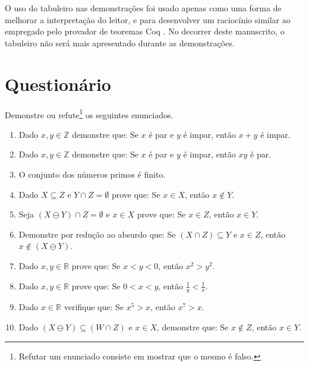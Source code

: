 \begin{rema}
	O uso do tabuleiro nas demonstrações foi usado apenas como uma forma de melhorar a interpretação do leitor, e para desenvolver um raciocínio similar ao empregado pelo provador de teoremas Coq \cite{coq2013}. No decorrer deste manuscrito, o tabuleiro não será mais apresentado durante as demonstrações.
\end{rema}



\section{Questionário}

\begin{exercise}\label{exerc:Demonstracao1}
	Demonstre ou refute\footnote{Refutar um enunciado consiste em mostrar que o mesmo é falso.} os seguintes enunciados.
\end{exercise}

\begin{enumerate}
	\item Dado $x, y \in \mathbb{Z}$ demonstre que: Se $x$ é par e $y$ é impar, então $x + y$ é impar.
	\item Dado $x, y \in \mathbb{Z}$ demonstre que: Se $x$ é par e $y$ é impar, então $xy$ é par.
	\item O conjunto dos números primos é finito.
	\item Dado $X \subseteq Z$ e $Y \cap Z = \emptyset$ prove que: Se $x \in X$, então $x \notin Y$.
	\item Seja $(X \ominus Y) \cap Z = \emptyset$ e $x \in X$ prove que: Se $x \in Z$, então $x \in Y$.
	\item Demonstre por redução ao absurdo que: Se $(X \cap Z) \subseteq Y$ e $x \in Z$, então $x \notin (X \ominus Y)$.
	\item Dado $x, y \in \mathbb{R}$ prove que: Se $x < y < 0$, então $x^2 > y^2$.
	\item Dado $x, y \in \mathbb{R}$ prove que: Se $0 < x < y$,  então $\displaystyle \frac{1}{y} < \frac{1}{x}$.
	\item Dado $x \in \mathbb{R}$ verifique que: Se $x^5 > x$, então $x^7 > x$.
	\item Dado $(X \ominus Y) \subseteq (W \cap Z)$ e $x \in X$, demonstre que: Se $x \notin Z$, então $x \in Y$.
\end{enumerate}


